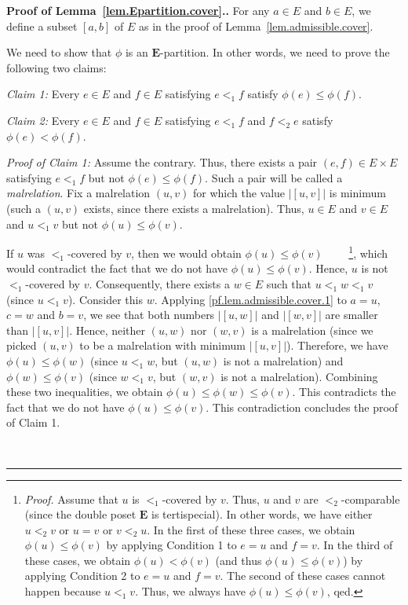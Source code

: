 \documentclass[numbers=enddot,12pt,final,onecolumn,notitlepage,abstracton]{scrartcl}
\theoremstyle{definition}
\newenvironment{proof}[1][Proof]{\noindent\textbf{#1.} }{\ \rule{0.5em}{0.5em}}
\newcommand{\EE}{{\mathbf{E}}}
\begin{document}
\begin{proof}[Proof of Lemma~\ref{lem.Epartition.cover}.]
For any $a \in E$ and $b \in E$, we define a subset
$\left[a, b\right]$ of $E$ as in the proof of
Lemma~\ref{lem.admissible.cover}.

We need to show that $\phi$ is an $\EE$-partition. In other words,
we need to prove the following two claims:

\textit{Claim 1:} Every $e \in E$ and $f \in E$ satisfying
$e <_1 f$ satisfy $\phi\left(e\right) \leq \phi\left(f\right)$.

\textit{Claim 2:} Every $e \in E$ and $f \in E$ satisfying
$e <_1 f$ and $f <_2 e$ satisfy
$\phi\left(e\right) < \phi\left(f\right)$.

\textit{Proof of Claim 1:} Assume the contrary. Thus, there
exists a pair $\left(e, f\right) \in E \times E$ satisfying
$e <_1 f$ but not $\phi\left(e\right) \leq \phi\left(f\right)$.
Such a pair will be called a \textit{malrelation}. Fix a
malrelation $\left(u, v\right)$ for which the value
$\left|\left[u, v\right]\right|$ is minimum (such a
$\left(u, v\right)$ exists, since there exists a malrelation).
Thus, $u \in E$ and $v \in E$ and $u <_1 v$ but not
$\phi\left(u\right) \leq \phi\left(v\right)$.

If $u$ was $<_1$-covered by $v$, then we would obtain
$\phi\left(u\right) \leq \phi\left(v\right)$
\ \ \ \ \footnote{\textit{Proof.} Assume that $u$ is
$<_1$-covered by $v$. Thus, $u$ and $v$ are $<_2$-comparable
(since the double poset $\EE$ is tertispecial). In other words,
we have either $u <_2 v$ or $u = v$ or $v <_2 u$. In the
first of these three cases, we obtain
$\phi\left(u\right) \leq \phi\left(v\right)$ by applying
Condition 1 to $e = u$ and $f = v$. In the third of these
cases, we obtain
$\phi\left(u\right) < \phi\left(v\right)$ (and thus
$\phi\left(u\right) \leq \phi\left(v\right)$) 
by applying Condition 2 to $e = u$ and $f = v$. The second
of these cases cannot happen because $u <_1 v$. Thus, we
always have $\phi\left(u\right) \leq \phi\left(v\right)$,
qed.}, which would
contradict the fact that we do not have
$\phi\left(u\right) \leq \phi\left(v\right)$. Hence, $u$ is not
$<_1$-covered by $v$. Consequently, there exists a $w \in E$
such that $u <_1 w <_1 v$ (since $u <_1 v$). Consider this
$w$. Applying \eqref{pf.lem.admissible.cover.1} to $a = u$,
$c = w$ and $b = v$, we see that both numbers
$\left|\left[u, w\right]\right|$ and
$\left|\left[w, v\right]\right|$ are smaller than
$\left|\left[u, v\right]\right|$. Hence, neither
$\left(u, w\right)$ nor $\left(w, v\right)$ is a malrelation
(since we picked $\left(u, v\right)$ to be a malrelation with
minimum $\left|\left[u, v\right]\right|$). Therefore, we have
$\phi\left(u\right) \leq \phi\left(w\right)$ (since $u <_1 w$,
but $\left(u, w\right)$ is not a malrelation) and
$\phi\left(w\right) \leq \phi\left(v\right)$ (since $w <_1 v$,
but $\left(w, v\right)$ is not a malrelation).
Combining these two inequalities, we obtain
$\phi\left(u\right) \leq \phi\left(w\right)
\leq \phi\left(v\right)$. This contradicts
the fact that we do not have
$\phi\left(u\right) \leq \phi\left(v\right)$. This contradiction
concludes the proof of Claim 1.


\end{proof}
\end{document}
